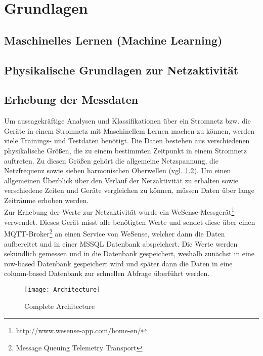 \chapter{Grundlagen}

\section{Maschinelles Lernen (Machine Learning)}

\section{Physikalische Grundlagen zur Netzaktivität} \label{physikalischeGrundlagen}

\section{Erhebung der Messdaten} \label{Messdaten}

    Um aussagekräftige Analysen und Klassifikationen über ein Stromnetz bzw. die Geräte in einem Stromnetz mit Maschinellem Lernen machen zu können, werden viele Trainings- und Testdaten benötigt.
    Die Daten bestehen aus verschiedenen physikalische Größen, die zu einem bestimmten Zeitpunkt in einem Stromnetz auftreten.
    Zu diesen Größen gehört die allgemeine Netzspannung, die Netzfrequenz sowie sieben harmonischen Oberwellen (vgl. \ref{physikalischeGrundlagen}).
    Um einen allgemeinen Überblick über den Verlauf der Netzaktivität zu erhalten sowie verschiedene Zeiten und Geräte vergleichen zu können, müssen Daten über lange Zeiträume erhoben werden.\\
    \newline
    Zur Erhebung der Werte zur Netzaktivität wurde ein WeSense-Messgerät\footnote{http://www.wesense-app.com/home-en/} verwendet.
    Dieses Gerät misst alle benötigten Werte und sendet diese über einen MQTT-Broker\footnote{Message Queuing Telemetry Transport} an einen Service von WeSense, welcher dann die Daten aufbereitet und in einer MSSQL Datenbank abspeichert.
    Die Werte werden sekündlich gemessen und in die Datenbank gespeichert, weshalb zunächst in eine row-based Datenbank gespeichert wird und später dann die Daten in eine column-based Datenbank zur schnellen Abfrage überführt werden.
    \newline

    \begin{figure}[h]
        \centering
        \texttt{[image: Architecture]}
        \caption{Complete Architecture}
        \label{fig:Architecture}
    \end{figure}

